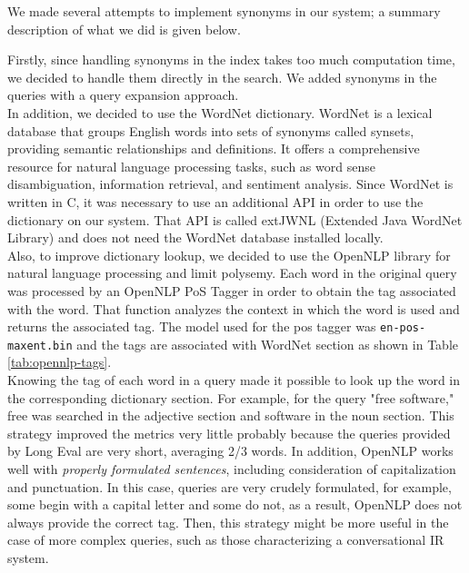 We made several attempts to implement synonyms in our system; a summary description of what we did is given below.

Firstly, since handling synonyms in the index takes too much computation time, we decided to handle them directly in the search. We added synonyms in the queries with a query expansion approach. \\

In addition, we decided to use the WordNet dictionary\citep{wordNet}. WordNet is a lexical database that groups English words into sets of synonyms called synsets, providing semantic relationships and definitions. It offers a comprehensive resource for natural language processing tasks, such as word sense disambiguation, information retrieval, and sentiment analysis.
Since WordNet is written in C, it was necessary to use an additional API in order to use the dictionary on our system. That API is called extJWNL (Extended Java WordNet Library)\citep{extJWNL} and does not need the WordNet database installed locally. \\

Also, to improve dictionary lookup, we decided to use the OpenNLP \citep{OpenNLP} library for natural language processing and limit polysemy. Each word in the original query was processed by an OpenNLP \ac{PoS} Tagger in order to obtain the tag associated with the word. That function analyzes the context in which the word is used and returns the associated tag. The model used for the pos tagger was \texttt{en-pos-maxent.bin} and the tags are associated with WordNet section as shown in Table \ref{tab:opennlp-tags}.\\
Knowing the tag of each word in a query made it possible to look up the word in the corresponding dictionary section. For example, for the query "free software," free was searched in the adjective section and software in the noun section.
This strategy improved the metrics very little probably because the queries provided by Long Eval are very short, averaging 2/3 words. In addition, OpenNLP works well with \emph{properly formulated sentences}, including consideration of capitalization and punctuation. In this case, queries are very crudely formulated, for example, some begin with a capital letter and some do not, as a result, OpenNLP does not always provide the correct tag. Then, this strategy might be more useful in the case of more complex queries, such as those characterizing a conversational \ac{IR} system. \\

